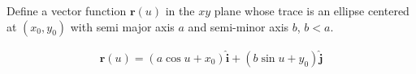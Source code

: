 Define a vector function $\boldsymbol{r}(u)$ in the $xy$ plane whose trace is an ellipse centered at $(x_0, y_0)$ with semi major axis $a$ and semi-minor axis $b$, $b<a$.

\begin{solution}
\begin{align*}
    \boldsymbol{r}(u) = (a\cos u + x_0) \hat{\boldsymbol{i}} + (b\sin u + y_0) \hat{\boldsymbol{j}}
\end{align*}
\end{solution}